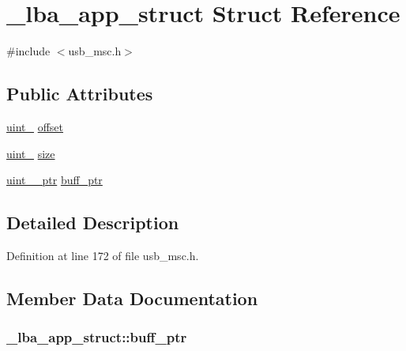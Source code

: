 \hypertarget{struct__lba__app__struct}{}\section{\+\_\+lba\+\_\+app\+\_\+struct Struct Reference}
\label{struct__lba__app__struct}


{\ttfamily \#include $<$usb\+\_\+msc.\+h$>$}

\subsection*{Public Attributes}
\begin{DoxyCompactItemize}
\item 
\hyperlink{types_8h_a5532400b872b4aa84e54335bf458a318}{uint\+\_} \hyperlink{struct__lba__app__struct_a0126cf44abc7a0ad2577a6f35fcd774b}{offset}
\item 
\hyperlink{types_8h_a5532400b872b4aa84e54335bf458a318}{uint\+\_} \hyperlink{struct__lba__app__struct_a8cf1d6a0e2a2d91897d6e0b17ae5e7b1}{size}
\item 
\hyperlink{types_8h_a7b968a76f3f622ee580e18acc3ab554c}{uint\+\_\+\_\+ptr} \hyperlink{struct__lba__app__struct_a12708ef50f4641b29e6364640da99a67}{buff\+\_\+ptr}
\end{DoxyCompactItemize}


\subsection{Detailed Description}


Definition at line 172 of file usb\+\_\+msc.\+h.



\subsection{Member Data Documentation}
\subsubsection[{\texorpdfstring{buff\+\_\+ptr}{buff_ptr}}]{ \+\_\+lba\+\_\+app\+\_\+struct\+::buff\+\_\+ptr}\hypertarget{struct__lba__app__struct_a12708ef50f4641b29e6364640da99a67}{}\label{struct__lba__app__struct_a12708ef50f4641b29e6364640da99a67}


